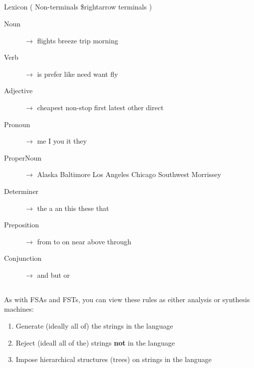 \documentclass[9pt,xcolor=pdftex,dvipsnames,table]{beamer}
\begin{document}
\subsection{}
\begin{frame}{Lexicon ( Non-terminals \$rightarrow terminals )}

	\begin{description}
		\item[Noun] $\rightarrow$ flights \textpipe{} breeze \textpipe{} trip \textpipe{} morning
		\item[Verb] $\rightarrow$ is \textpipe{} prefer \textpipe{} like \textpipe{} need \textpipe{} want \textpipe{} fly
		\item[Adjective] $\rightarrow$ cheapest \textpipe{} non-stop \textpipe{} first \textpipe{} latest \textpipe{} other \textpipe{} direct
		\item[Pronoun] $\rightarrow$ me \textpipe{} I \textpipe{} you \textpipe{} it \textpipe{} they
		\item[ProperNoun] $\rightarrow$ Alaska \textpipe{} Baltimore \textpipe{} Los Angeles \textpipe{} Chicago \textpipe{} Southwest \textpipe{} Morrissey
		\item[Determiner] $\rightarrow$ the \textpipe{} a \textpipe{} an \textpipe{} this \textpipe{} these \textpipe{} that
		\item[Preposition] $\rightarrow$ from \textpipe{} to \textpipe{} on \textpipe{} near \textpipe{} above \textpipe{} through
		\item[Conjunction] $\rightarrow$ and \textpipe{} but \textpipe{} or
	\end{description}
\end{frame}


\subsection{}
\begin{frame}{}

{\large As with FSAs and FSTs, you can view these rules as either analysis or synthesis machines:}
\vspace{.25cm}
	\begin{enumerate}
		\item Generate (ideally all of) the strings in the language
		\item Reject (ideall all of the) strings \textbf{not} in the language
		\item Impose hierarchical structures (trees) on strings in the language
\end{enumerate}
\end{frame}
\end{document}
